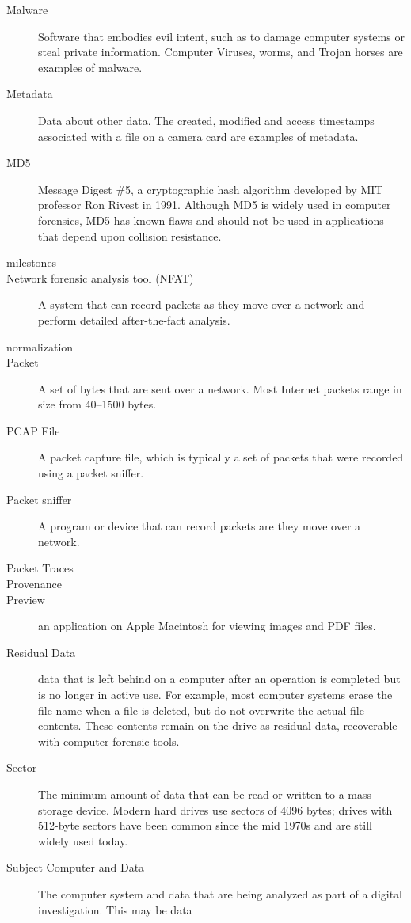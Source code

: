 \begin{description}
\item[Malware] Software that embodies evil intent, such as to damage
  computer systems or steal private information. Computer Viruses,
  worms, and Trojan horses are examples of malware. 
\item[Metadata] Data about other data. The created, modified and
  access timestamps associated with a file on a camera card are
  examples of metadata.
\item[MD5] Message Digest \#5, a cryptographic hash algorithm
  developed by MIT professor Ron Rivest in 1991. Although MD5 is
  widely used in computer forensics, MD5 has known flaws and should
  not be used in applications that depend upon collision resistance.
\item[milestones] \pageref{def:milestones}
 \item[Network forensic analysis tool (NFAT)] A system that can record
   packets as they move over a network and perform detailed
  after-the-fact analysis.
 \item[normalization]
 \item[Packet] A set of bytes that are sent over a network. Most
   Internet packets range in size from 40--1500 bytes.
 \item[PCAP File] A packet capture file, which is typically a set of
   packets that were recorded using a packet sniffer.
 \item[Packet sniffer] A program or device that can record packets are
   they move over a network.
 \item[Packet Traces]
 \item[Provenance]
\item[Preview] an application on Apple Macintosh for viewing images
  and PDF files. 
\item[Residual Data] data that is left behind on a computer after an
  operation is completed but is no longer in active use. For example,
  most computer systems erase the file name when a file is deleted,
  but do not overwrite the actual file contents. These contents remain
  on the drive as residual data, recoverable with computer forensic tools.
\item[Sector] The minimum amount of data that can be read or written
  to a mass storage device. Modern hard drives use sectors of 4096
  bytes; drives with 512-byte sectors have been common since the mid
  1970s and are still widely used today.
\item[Subject Computer and Data] The computer system and data that are
  being analyzed as part of a digital investigation. This may be data

\end{description}
